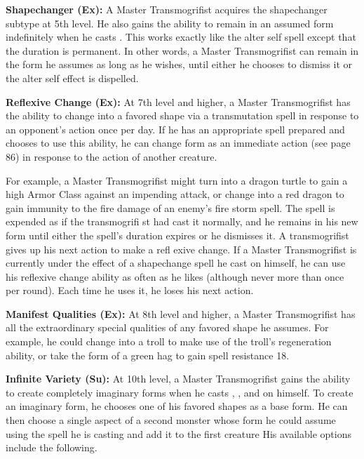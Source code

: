 \textbf{Shapechanger (Ex):} A Master Transmogrifist acquires the shapechanger subtype at 5th level. He also gains the ability to remain in an assumed form indefinitely when he casts . This works exactly like the alter self spell except that the duration is permanent. In other words, a Master Transmogrifist can remain in the form he assumes as long as he wishes, until either he chooses to dismiss it or the alter self effect is dispelled.

\textbf{Reflexive Change (Ex):} At 7th level and higher, a Master Transmogrifist has the ability to change into a favored shape via a transmutation spell in response to an opponent’s action once per day. If he has an appropriate spell prepared and chooses to use this ability, he can change form as an immediate action (see page 86) in response to the action of another creature.

For example, a Master Transmogrifist might turn into a dragon turtle to gain a high Armor Class against an impending attack, or change into a red dragon to gain immunity to the fire damage of an enemy’s fire storm spell. The spell is expended as if the transmogrifi st had cast it normally, and he remains in his new form until either the spell’s duration expires or he dismisses it. A transmogrifist gives up his next action to make a refl exive change. If a Master Transmogrifist is currently under the effect of a shapechange spell he cast on himself, he can use his reflexive change ability as often as he likes (although never more than once per round). Each time he uses it, he loses his next action.

\textbf{Manifest Qualities (Ex):} At 8th level and higher, a Master Transmogrifist has all the extraordinary special qualities of any favored shape he assumes. For example, he could change into a troll to make use of the troll’s regeneration ability, or take the form of a green hag to gain spell resistance 18.

\textbf{Infinite Variety (Su):} At 10th level, a Master Transmogrifist gains the ability to create completely imaginary forms when he casts , , and  on himself. To create an imaginary form, he chooses one of his favored shapes as a base form. He can then choose a single aspect of a second monster whose form he could assume using the spell he is casting and add it to the first creature  His available options include the following.

